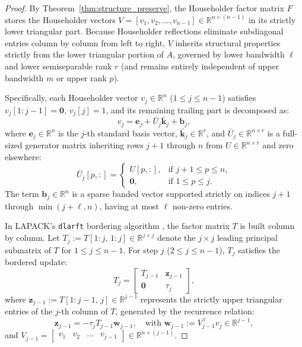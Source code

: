 \documentclass[a4paper,fleqn]{cas-sc}
\begin{document}
\begin{proof}
By Theorem~\ref{thm:structure_preserve}, the Householder factor matrix $F$ stores the Householder vectors $V = [v_1, v_2, \dots, v_{n-1}] \in \mathbb{R}^{n \times (n-1)}$ in its strictly lower triangular part. Because Householder reflections eliminate subdiagonal entries column by column from left to right, $V$ inherits structural properties strictly from the lower triangular portion of $A$, governed by lower bandwidth $\ell$ and lower semiseparable rank $r$ (and remains entirely independent of upper bandwidth $m$ or upper rank $p$). 

Specifically, each Householder vector $v_j \in \mathbb{R}^n$ ($1 \le j \le n-1$) satisfies $v_j[1:j-1] = \mathbf{0}$, $v_j[j] = 1$, and its remaining trailing part is decomposed as:
\[
v_j = \mathbf{e}_j + \bar{U}_j \bar{\mathbf{k}}_j + \mathbf{b}_j,
\]
where $\mathbf{e}_j \in \mathbb{R}^n$ is the $j$-th standard basis vector, $\bar{\mathbf{k}}_j \in \mathbb{R}^r$, and $\bar{U}_j \in \mathbb{R}^{n \times r}$ is a full-sized generator matrix inheriting rows $j+1$ through $n$ from $U \in \mathbb{R}^{n \times r}$ and zero elsewhere:
\[
\bar{U}_j[p, :] = \begin{cases} U[p, :], & \text{if } j+1 \le p \le n, \\ \mathbf{0}, & \text{if } 1 \le p \le j. \end{cases}
\]
The term $\mathbf{b}_j \in \mathbb{R}^n$ is a sparse banded vector supported strictly on indices $j+1$ through $\min(j+\ell, n)$, having at most $\ell$ non-zero entries.

In LAPACK's \texttt{dlarft} bordering algorithm \citep{doi:10.1137/1.9780898719604}, the factor matrix $T$ is built column by column. Let $T_j := T[1\!:\!j, \, 1\!:\!j] \in \mathbb{R}^{j \times j}$ denote the $j \times j$ leading principal submatrix of $T$ for $1 \le j \le n-1$. For step $j$ ($2 \le j \le n-1$), $T_j$ satisfies the bordered update:
\[
T_j = \begin{bmatrix} T_{j-1} & \mathbf{z}_{j-1} \\ \mathbf{0} & \tau_j \end{bmatrix},
\]
where $\mathbf{z}_{j-1} := T[1:j-1, \, j] \in \mathbb{R}^{j-1}$ represents the strictly upper triangular entries of the $j$-th column of $T$, generated by the recurrence relation:
\begin{equation} \label{eq:t_gen_recurrence}
\mathbf{z}_{j-1} = -\tau_j T_{j-1} \mathbf{w}_{j-1}, \quad \text{with } \mathbf{w}_{j-1} := V_{j-1}^\top v_j \in \mathbb{R}^{j-1},
\end{equation}
and $V_{j-1} = \begin{bmatrix} v_1 & v_2 & \dots & v_{j-1} \end{bmatrix} \in \mathbb{R}^{n \times (j-1)}$.


\end{proof}
\end{document}
